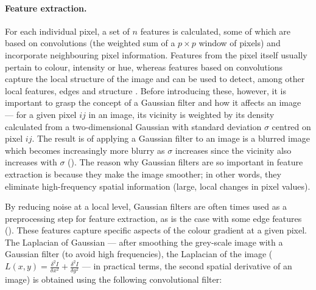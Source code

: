\begin{figure}[!ht]
	\label{fig:segmentation-example-image-labels}
\end{figure}

\paragraph{Feature extraction.} For each individual pixel, a set of $n$ features is calculated, some of which are based on convolutions (the weighted sum of a $p \times p$ window of pixels) and incorporate neighbouring pixel information. Features from the pixel itself usually pertain to colour, intensity or hue, whereas features based on convolutions capture the local structure of the image and can be used to detect, among other local features, edges \cite{Canny1986-pi} and structure \cite{Sato1998-sy}. Before introducing these, however, it is important to grasp the concept of a Gaussian filter and how it affects an image --- for a given pixel $ij$ in an image, its vicinity is weighted by its density calculated from a two-dimensional Gaussian with standard deviation $\sigma$ centred on pixel $ij$. The result is of applying a Gaussian filter to an image is a blurred image which becomes increasingly more blurry as $\sigma$ increases since the vicinity also increases with $\sigma$ (). The reason why Gaussian filters are so important in feature extraction is because they make the image smoother; in other words, they eliminate high-frequency spatial information (large, local changes in pixel values).

\begin{figure}[!ht]
	\label{fig:segmentation-example-gaussian-filter}
\end{figure}

By reducing noise at a local level, Gaussian filters are often times used as a preprocessing step for feature extraction, as is the case with some edge features (). These features capture specific aspects of the colour gradient at a given pixel. The Laplacian of Gaussian --- after smoothing the grey-scale image with a Gaussian filter (to avoid high frequencies), the Laplacian of the image ($L(x,y) = \frac{\delta^2I}{\delta x^2} + \frac{\delta^2I}{\delta y^2}$ --- in practical terms, the second spatial derivative of an image) is obtained using the following convolutional filter:
	
